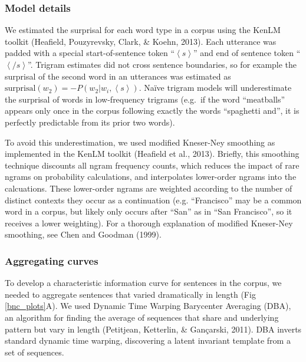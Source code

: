 \documentclass[man,floatsintext]{apa6}
\begin{document}
\hypertarget{model-details}{%
\subsubsection{Model details}\label{model-details}}

We estimated the surprisal for each word type in a corpus using the KenLM toolkit (Heafield, Pouzyrevsky, Clark, \& Koehn, 2013). Each utterance was padded with a special start-of-sentence token \enquote{\(\left<s\right>\)} and end of sentence token \enquote{\(\left</s\right>\)}. Trigram estimates did not cross sentence boundaries, so for example the surprisal of the second word in an utterances was estimated as \(\text{surprisal}(w_{2}) = -P(w_2|w_{i},\left<s\right>)\). Naïve trigram models will underestimate the surprisal of words in low-frequency trigrams (e.g.~if the word \enquote{meatballs} appears only once in the corpus following exactly the words \enquote{spaghetti and}, it is perfectly predictable from its prior two words).

To avoid this underestimation, we used modified Kneser-Ney smoothing as implemented in the KenLM toolkit (Heafield et al., 2013). Briefly, this smoothing technique discounts all ngram frequency counts, which reduces the impact of rare ngrams on probability calculations, and interpolates lower-order ngrams into the calcuations. These lower-order ngrams are weighted according to the number of distinct contexts they occur as a continuation (e.g. \enquote{Francisco} may be a common word in a corpus, but likely only occurs after \enquote{San} as in \enquote{San Francisco}, so it receives a lower weighting). For a thorough explanation of modified Kneser-Ney smoothing, see Chen and Goodman (1999).

\hypertarget{aggregating-curves}{%
\subsubsection{Aggregating curves}\label{aggregating-curves}}

To develop a characteristic information curve for sentences in the corpus, we needed to aggregate sentences that varied dramatically in length (Fig \ref{bnc_plots}A). We used Dynamic Time Warping Barycenter Averaging (DBA), an algorithm for finding the average of sequences that share and underlying pattern but vary in length (Petitjean, Ketterlin, \& Gançarski, 2011). DBA inverts standard dynamic time warping, discovering a latent invariant template from a set of sequences.
\end{document}
